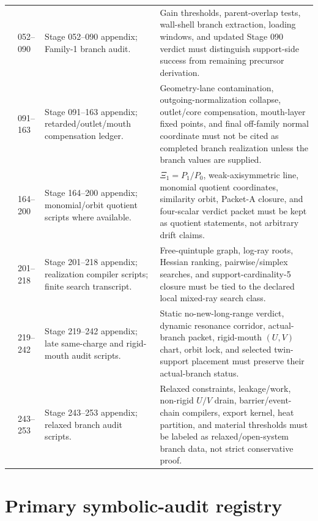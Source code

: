 \begin{longtable}{@{}L{0.12\textwidth}L{0.15\textwidth}L{0.24\textwidth}L{0.34\textwidth}@{}}
\addlinespace
{} & 052--090 & Stage 052--090 appendix; Family-1 branch audit. & Gain thresholds, parent-overlap tests, wall-shell branch extraction, loading windows, and updated Stage 090 verdict must distinguish support-side success from remaining precursor derivation. \\
\addlinespace
{} & 091--163 & Stage 091--163 appendix; retarded/outlet/mouth compensation ledger. & Geometry-lane contamination, outgoing-normalization collapse, outlet/core compensation, mouth-layer fixed points, and final off-family normal coordinate must not be cited as completed branch realization unless the branch values are supplied. \\
\addlinespace
{} & 164--200 & Stage 164--200 appendix; monomial/orbit quotient scripts where available. & \(\Xi_1=P_1/P_0\), weak-axisymmetric line, monomial quotient coordinates, similarity orbit, Packet-A closure, and four-scalar verdict packet must be kept as quotient statements, not arbitrary drift claims. \\
\addlinespace
{} & 201--218 & Stage 201--218 appendix; realization compiler scripts; finite search transcript. & Free-quintuple graph, log-ray roots, Hessian ranking, pairwise/simplex searches, and support-cardinality-5 closure must be tied to the declared local mixed-ray search class. \\
\addlinespace
{} & 219--242 & Stage 219--242 appendix; late same-charge and rigid-mouth audit scripts. & Static no-new-long-range verdict, dynamic resonance corridor, actual-branch packet, rigid-mouth \((U,V)\) chart, orbit lock, and selected twin-support placement must preserve their actual-branch status. \\
\addlinespace
{} & 243--253 & Stage 243--253 appendix; relaxed branch audit scripts. & Relaxed constraints, leakage/work, non-rigid \(U/V\) drain, barrier/event-chain compilers, export kernel, heat partition, and material thresholds must be labeled as relaxed/open-system branch data, not strict conservative proof. \\
\bottomrule
\end{longtable}

\section{Primary symbolic-audit registry}
\label{sec:primary-symbolic-audit-registry}

